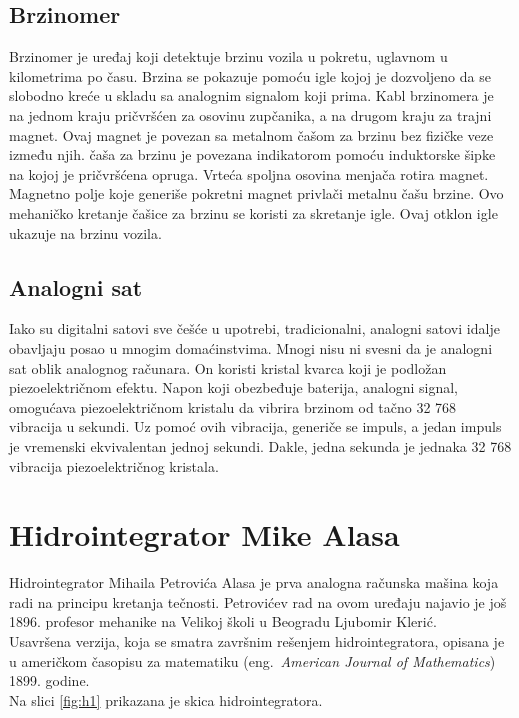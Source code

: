 \documentclass[a4paper]{article}
\begin{document}
\subsection{Brzinomer}
\label{subsec:podnaslov5}

Brzinomer je uređaj koji detektuje brzinu vozila u pokretu, uglavnom u kilometrima po času. Brzina se pokazuje pomoću igle kojoj je dozvoljeno da se slobodno kreće u skladu sa analognim signalom koji prima. Kabl brzinomera je na jednom kraju pričvršćen za osovinu zupčanika, a na drugom kraju za trajni magnet. Ovaj magnet je povezan sa metalnom čašom za brzinu bez fizičke veze između njih. čaša za brzinu je povezana indikatorom pomoću induktorske šipke na kojoj je pričvršćena opruga. Vrteća spoljna osovina menjača rotira magnet. Magnetno polje koje generiše pokretni magnet privlači metalnu čašu brzine. Ovo mehaničko kretanje čašice za brzinu se koristi za skretanje igle. Ovaj otklon igle ukazuje na brzinu vozila.


\subsection{Analogni sat}
\label{subsec:podnaslov6}


Iako su digitalni satovi sve češće u upotrebi, tradicionalni, analogni satovi idalje obavljaju posao u mnogim domaćinstvima. Mnogi nisu ni svesni da je analogni sat oblik analognog računara. On koristi kristal kvarca koji je podložan piezoelektričnom efektu. Napon koji obezbeđuje baterija, analogni signal, omogućava piezoelektričnom kristalu da vibrira brzinom od tačno 32 768 vibracija u sekundi. Uz pomoć ovih vibracija, generiče se impuls, a jedan impuls je vremenski ekvivalentan jednoj sekundi. Dakle, jedna sekunda je jednaka 32 768 vibracija piezoelektričnog kristala.

\section{Hidrointegrator Mike Alasa}	
\label{sec:hidrointegrator}

Hidrointegrator Mihaila Petrovića Alasa je prva analogna računska mašina koja radi na principu kretanja tečnosti. Petrovićev rad na ovom uređaju najavio je još 1896. profesor mehanike na Velikoj školi u Beogradu Ljubomir Klerić.\\
Usavršena verzija, koja se smatra završnim rešenjem hidrointegratora, opisana je u američkom časopisu za matematiku (eng.~{\em American Journal of Mathematics}) 1899. godine.\cite{hidrointegrator}\\
Na slici \ref{fig:h1} prikazana je skica hidrointegratora. 
\end{document}
